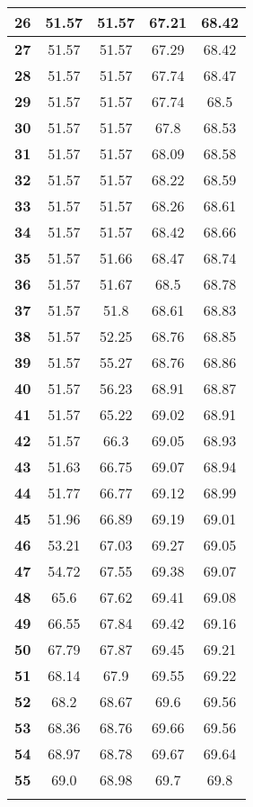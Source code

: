 \begin{longtable}{|c|c|c|c|c|}
\textbf{26} & 51.57 & 51.57 & 67.21 & 68.42 \\ \hline 
\textbf{27} & 51.57 & 51.57 & 67.29 & 68.42 \\ \hline 
\textbf{28} & 51.57 & 51.57 & 67.74 & 68.47 \\ \hline 
\textbf{29} & 51.57 & 51.57 & 67.74 & 68.5 \\ \hline 
\textbf{30} & 51.57 & 51.57 & 67.8 & 68.53 \\ \hline 
\textbf{31} & 51.57 & 51.57 & 68.09 & 68.58 \\ \hline 
\textbf{32} & 51.57 & 51.57 & 68.22 & 68.59 \\ \hline 
\textbf{33} & 51.57 & 51.57 & 68.26 & 68.61 \\ \hline 
\textbf{34} & 51.57 & 51.57 & 68.42 & 68.66 \\ \hline 
\textbf{35} & 51.57 & 51.66 & 68.47 & 68.74 \\ \hline 
\textbf{36} & 51.57 & 51.67 & 68.5 & 68.78 \\ \hline 
\textbf{37} & 51.57 & 51.8 & 68.61 & 68.83 \\ \hline 
\textbf{38} & 51.57 & 52.25 & 68.76 & 68.85 \\ \hline 
\textbf{39} & 51.57 & 55.27 & 68.76 & 68.86 \\ \hline 
\textbf{40} & 51.57 & 56.23 & 68.91 & 68.87 \\ \hline 
\textbf{41} & 51.57 & 65.22 & 69.02 & 68.91 \\ \hline 
\textbf{42} & 51.57 & 66.3 & 69.05 & 68.93 \\ \hline 
\textbf{43} & 51.63 & 66.75 & 69.07 & 68.94 \\ \hline 
\textbf{44} & 51.77 & 66.77 & 69.12 & 68.99 \\ \hline 
\textbf{45} & 51.96 & 66.89 & 69.19 & 69.01 \\ \hline 
\textbf{46} & 53.21 & 67.03 & 69.27 & 69.05 \\ \hline 
\textbf{47} & 54.72 & 67.55 & 69.38 & 69.07 \\ \hline 
\textbf{48} & 65.6 & 67.62 & 69.41 & 69.08 \\ \hline 
\textbf{49} & 66.55 & 67.84 & 69.42 & 69.16 \\ \hline 
\textbf{50} & 67.79 & 67.87 & 69.45 & 69.21 \\ \hline 
\textbf{51} & 68.14 & 67.9 & 69.55 & 69.22 \\ \hline 
\textbf{52} & 68.2 & 68.67 & 69.6 & 69.56 \\ \hline 
\textbf{53} & 68.36 & 68.76 & 69.66 & 69.56 \\ \hline 
\textbf{54} & 68.97 & 68.78 & 69.67 & 69.64 \\ \hline 
\textbf{55} & 69.0 & 68.98 & 69.7 & 69.8 \\ \hline 

    \caption[]{}
    \label{Tab:}
\end{longtable}